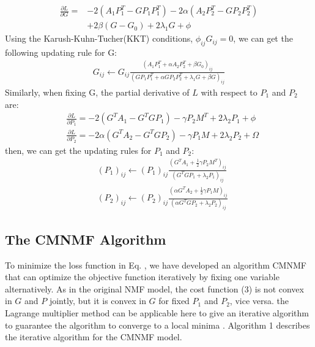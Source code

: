 \documentclass{bmcart}
\begin{document}
\begin{equation}\label{S-CMNMF-gradient}
\begin{split}
\frac{\partial{L}}{\partial{G}}=
&-2(A_1{P_1^T} - G{P_1}{P_1^T})-2\alpha(A_2{P_2^T} - G{P_2}{P_2^T})\\
&+2\beta(G-G_0)+2\lambda_1G+\phi
\end{split}
\end{equation}
Using the Karush-Kuhn-Tucher(KKT) conditions, $\phi_{ij}G_{ij}=0$, we can get the following updating rule for G:
\begin{equation}\label{updating_G}
\begin{split}
G_{ij}\leftarrow G_{ij}
\frac{(A_1P_1^T+\alpha A_2P_2^T+\beta G_0)_{ij}}
{(GP_1P_1^T+\alpha GP_2P_2^T+\lambda_1G+\beta G)_{ij}}
\end{split}
\end{equation}
Similarly, when fixing G, the partial derivative of $L$ with respect to $P_1$ and $P_2$ are:
\begin{equation}\label{derivate_P}
\begin{split}
&\frac{\partial{L}}{\partial{P_1}}=
-2(G^TA_1-{G^TGP_1})-\gamma P_2M^T +2\lambda_2P_1+\phi\\
&\frac{\partial{L}}{\partial{P_2}}=
-2\alpha(G^TA_2-{G^TGP_2})-\gamma P_1M +2\lambda_2P_2+\Omega
\end{split}
\end{equation}
then, we can get the updating rules for $P_1$ and $P_2$:
\begin{equation}\label{updating_P}
\begin{split}
&(P_1)_{ij}\leftarrow (P_1)_{ij}
\frac{(G^TA_1+\frac{1}{2}\gamma P_2M^T)_{ij}}
{(G^TGP_1+\lambda_2P_1)_{ij}}\\
&(P_2)_{ij}\leftarrow (P_2)_{ij}
\frac{(\alpha G^TA_2+\frac{1}{2}\gamma P_1M)_{ij}}
{(\alpha G^TGP_2 + \lambda_2P_2)_{ij}}
\end{split}
\end{equation}
\subsection*{The CMNMF Algorithm}
To minimize the loss function in Eq. , we have developed an algorithm CMNMF that can optimize the objective function iteratively by fixing one variable alternatively. As in the original NMF model, the cost function (3) is not convex in $G$ and $P$ jointly, but it is convex in $G$ for fixed $P_1$ and $P_2$, vice versa. the Lagrange multiplier method can be applicable here to give an iterative algorithm to guarantee the algorithm to converge to a local minima \cite{document_cluster_NMF}. Algorithm 1 describes the iterative algorithm for the CMNMF model.
\end{document}
